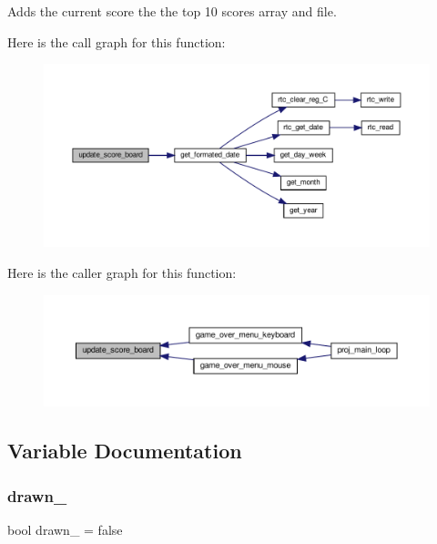 Adds the current score the the top 10 scores array and file. 

Here is the call graph for this function\+:
\nopagebreak
\begin{figure}[H]
\begin{center}
\leavevmode
\includegraphics[width=350pt]{group__Game-Over-Menu_gaacffded003ea0e055b93b3cf2bf26293_cgraph}
\end{center}
\end{figure}
Here is the caller graph for this function\+:
\nopagebreak
\begin{figure}[H]
\begin{center}
\leavevmode
\includegraphics[width=350pt]{group__Game-Over-Menu_gaacffded003ea0e055b93b3cf2bf26293_icgraph}
\end{center}
\end{figure}


\subsection{Variable Documentation}
\mbox{\label{group__Game-Over-Menu_ga11932993f5f2c243a9c6e09519cf1b73}} 
\subsubsection{\texorpdfstring{drawn\+\_\+}{drawn\_}}
{\footnotesize\ttfamily bool drawn\+\_\+ = false}



